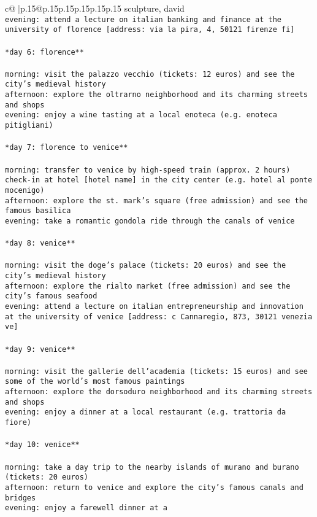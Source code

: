 \documentclass{article}
\begin{document}
{\begin{supertabular}{c@{$\;$}|p{.15\linewidth}@{}p{.15\linewidth}p{.15\linewidth}p{.15\linewidth}p{.15\linewidth}p{.15\linewidth}}
{{{sculpture, david\\ \tt * evening: attend a lecture on italian banking and finance at the university of florence [address: via la pira, 4, 50121 firenze fi]\\ \tt \\ \tt **day 6: florence**\\ \tt \\ \tt * morning: visit the palazzo vecchio (tickets: 12 euros) and see the city's medieval history\\ \tt * afternoon: explore the oltrarno neighborhood and its charming streets and shops\\ \tt * evening: enjoy a wine tasting at a local enoteca (e.g. enoteca pitigliani)\\ \tt \\ \tt **day 7: florence to venice**\\ \tt \\ \tt * morning: transfer to venice by high-speed train (approx. 2 hours)\\ \tt * check-in at hotel [hotel name] in the city center (e.g. hotel al ponte mocenigo)\\ \tt * afternoon: explore the st. mark's square (free admission) and see the famous basilica\\ \tt * evening: take a romantic gondola ride through the canals of venice\\ \tt \\ \tt **day 8: venice**\\ \tt \\ \tt * morning: visit the doge's palace (tickets: 20 euros) and see the city's medieval history\\ \tt * afternoon: explore the rialto market (free admission) and see the city's famous seafood\\ \tt * evening: attend a lecture on italian entrepreneurship and innovation at the university of venice [address: c Cannaregio, 873, 30121 venezia ve]\\ \tt \\ \tt **day 9: venice**\\ \tt \\ \tt * morning: visit the gallerie dell'academia (tickets: 15 euros) and see some of the world's most famous paintings\\ \tt * afternoon: explore the dorsoduro neighborhood and its charming streets and shops\\ \tt * evening: enjoy a dinner at a local restaurant (e.g. trattoria da fiore)\\ \tt \\ \tt **day 10: venice**\\ \tt \\ \tt * morning: take a day trip to the nearby islands of murano and burano (tickets: 20 euros)\\ \tt * afternoon: return to venice and explore the city's famous canals and bridges\\ \tt * evening: enjoy a farewell dinner at a }}}
\end{supertabular}}
\end{document}
